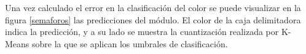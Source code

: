 	Una vez calculado el error en la clasificación del color se puede visualizar en la figura \ref{semaforos} las predicciones del módulo. El color de la caja delimitadora indica la predicción, y a su lado se muestra la cuantización realizada por K-Means sobre la que se aplican los umbrales de clasificación.
	
